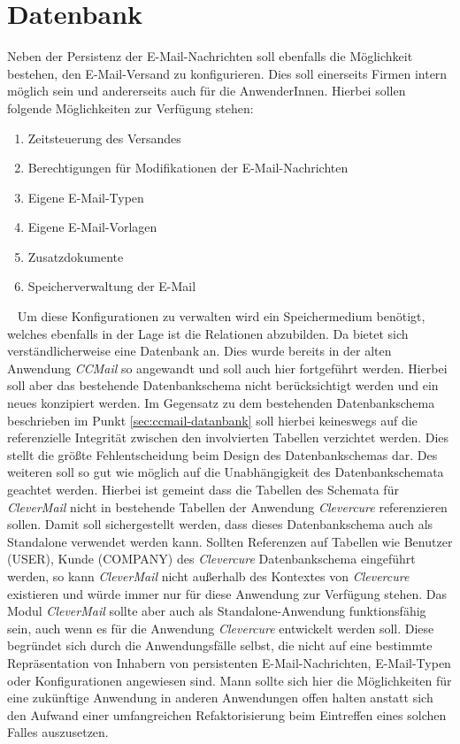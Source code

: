 \section{Datenbank}
Neben der Persistenz der E-Mail-Nachrichten soll ebenfalls die Möglichkeit bestehen, den E-Mail-Versand zu konfigurieren. Dies soll einerseits Firmen intern möglich sein und andererseits auch für die AnwenderInnen. Hierbei sollen folgende Möglichkeiten zur Verfügung stehen:
\begin{enumerate}
	\item Zeitsteuerung des Versandes
	\item Berechtigungen für Modifikationen der E-Mail-Nachrichten
	\item Eigene E-Mail-Typen
	\item Eigene E-Mail-Vorlagen
	\item Zusatzdokumente 
	\item Speicherverwaltung der E-Mail
\end{enumerate}
\ \newline
Um diese Konfigurationen zu verwalten wird ein Speichermedium benötigt, welches ebenfalls in der Lage ist die Relationen abzubilden. Da bietet sich verständlicherweise eine Datenbank an. Dies wurde bereits in der alten Anwendung \emph{CCMail} so angewandt und soll auch hier fortgeführt werden. Hierbei soll aber das bestehende Datenbankschema nicht berücksichtigt werden und ein neues konzipiert werden. Im Gegensatz zu dem bestehenden Datenbankschema beschrieben im Punkt \ref{sec:ccmail-datanbank} soll hierbei keineswegs auf die referenzielle Integrität zwischen den involvierten Tabellen verzichtet werden. Dies stellt die größte Fehlentscheidung beim Design des Datenbankschemas dar. Des weiteren soll so gut wie möglich auf die Unabhängigkeit des Datenbankschemata geachtet werden. Hierbei ist gemeint dass die Tabellen des Schemata für \emph{CleverMail} nicht in bestehende Tabellen der Anwendung \emph{Clevercure} referenzieren sollen. Damit soll sichergestellt werden, dass dieses Datenbankschema auch als Standalone verwendet werden kann. Sollten Referenzen auf Tabellen wie Benutzer (USER), Kunde (COMPANY) des \emph{Clevercure} Datenbankschema eingeführt werden, so kann \emph{CleverMail} nicht außerhalb des Kontextes von \emph{Clevercure} existieren und würde immer nur für diese Anwendung zur Verfügung stehen. Das Modul \emph{CleverMail} sollte aber auch als Standalone-Anwendung funktionsfähig sein, auch wenn es für die Anwendung \emph{Clevercure} entwickelt werden soll. Diese begründet sich durch die Anwendungsfälle selbst, die nicht auf eine bestimmte Repräsentation von Inhabern von persistenten E-Mail-Nachrichten, E-Mail-Typen oder Konfigurationen angewiesen sind. Mann sollte sich hier die Möglichkeiten für eine zukünftige Anwendung in anderen Anwendungen offen halten anstatt sich den Aufwand einer umfangreichen Refaktorisierung beim Eintreffen eines solchen Falles auszusetzen. 
